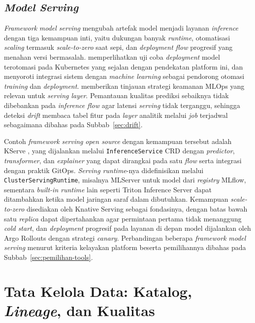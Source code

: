 \subsection{\textit{Model Serving}}
\label{subsec:serving}

\textit{Framework} \textit{model serving} mengubah artefak model menjadi layanan \textit{inference} dengan tiga kemampuan inti, yaitu dukungan banyak \textit{runtime}, otomatisasi \textit{scaling} termasuk \textit{scale-to-zero} saat sepi, dan \textit{deployment flow} progresif yang menahan versi bermasalah. \textcite{hsu2024endtoend} memperlihatkan uji coba \textit{deployment} model terotomasi pada Kubernetes yang sejalan dengan pendekatan platform ini, dan \textcite{liang2024automating} menyoroti integrasi sistem dengan \textit{machine learning} sebagai pendorong otomasi \textit{training} dan \textit{deployment}. \textcite{ahmad2024mlops} memberikan tinjauan strategi keamanan MLOps yang relevan untuk \textit{serving layer}. Pemantauan kualitas prediksi sebaiknya tidak dibebankan pada \textit{inference flow} agar latensi \textit{serving} tidak terganggu, sehingga deteksi \textit{drift} membaca tabel fitur pada \textit{layer} analitik melalui \textit{job} terjadwal sebagaimana dibahas pada Subbab~\ref{sec:drift}.

Contoh \textit{framework} \textit{serving} \textit{open source} dengan kemampuan tersebut adalah KServe \autocite{kserve2024}, yang dijalankan melalui \texttt{InferenceService} CRD dengan \textit{predictor}, \textit{transformer}, dan \textit{explainer} yang dapat dirangkai pada satu \textit{flow} serta integrasi dengan praktik GitOps. \textit{Serving runtime}-nya didefinisikan melalui \texttt{ClusterServingRuntime}, misalnya MLServer untuk model dari \textit{registry} MLflow, sementara \textit{built-in runtime} lain seperti Triton Inference Server dapat ditambahkan ketika model jaringan saraf dalam dibutuhkan. Kemampuan \textit{scale-to-zero} disediakan oleh Knative Serving sebagai fondasinya, dengan batas bawah satu \textit{replica} dapat dipertahankan agar permintaan pertama tidak menanggung \textit{cold start}, dan \textit{deployment} progresif pada layanan di depan model dijalankan oleh Argo Rollouts dengan strategi \textit{canary}. Perbandingan beberapa \textit{framework} \textit{model serving} menurut kriteria kelayakan platform beserta pemilihannya dibahas pada Subbab~\ref{sec:pemilihan-tools}.

\section{Tata Kelola Data: Katalog, \textit{Lineage}, dan Kualitas}
\label{sec:tata-kelola-teori}

